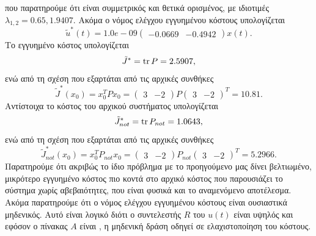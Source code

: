 που παρατηρούμε ότι είναι συμμετρικός και θετικά ορισμένος, με ιδιοτιμές
\( \lambda_{1,2} = 0.65, 1.9407 \). Ακόμα ο νόμος ελέγχου εγγυημένου κόστους
υπολογίζεται
\[
    \tilde{u}^*(t) =
    1.0e-09
    \begin{pmatrix}
        -0.0669 & -0.4942
    \end{pmatrix}x(t).
\]
Το εγγυημένο κόστος υπολογίζεται
\[
    \tilde{J}^* = \operatorname{tr}{P} = 2.5907,
\]
ενώ από τη σχέση που εξαρτάται από τις αρχικές συνθήκες
\[
    \tilde{J}^*(x_0) = x_0^{T}Px_0 =
    \begin{pmatrix}
        3 & -2
    \end{pmatrix}P
    \begin{pmatrix}
        3 & -2
    \end{pmatrix}^T = 10.81.
\]
Αντίστοιχα το κόστος του αρχικού συστήματος υπολογίζεται
\[
    \tilde{J}^*_{not} = \operatorname{tr}{P}_{not} = 1.0643,
\]
ενώ από τη σχέση που εξαρτάται από τις αρχικές συνθήκες
\[
    \tilde{J}^*_{not}(x_0) = x_0^{T}P_{not}x_0 =
    \begin{pmatrix}
        3 & -2
    \end{pmatrix}P_{not}
    \begin{pmatrix}
        3 & -2
    \end{pmatrix}^T = 5.2966.
\]
Παρατηρούμε ότι ακριβώς το ίδιο πρόβλημα με το προηγούμενο μας δίνει βελτιωμένο,
μικρότερο εγγυημένο κόστος πιο κοντά στο αρχικό κόστος που παρουσιάζει το
σύστημα χωρίς αβεβαιότητες, που είναι φυσικά και το αναμενόμενο αποτέλεσμα.
Ακόμα παρατηρούμε ότι ο νόμος ελέγχου εγγυημένου κόστους είναι ουσιαστικά
μηδενικός. Αυτό είναι λογικό διότι ο συντελεστής \( R \) του \( u(t) \) είναι
υψηλός και εφόσον ο πίνακας \( A \) είναι , η μηδενική δράση οδηγεί
σε ελαχιστοποίηση του κόστους.

